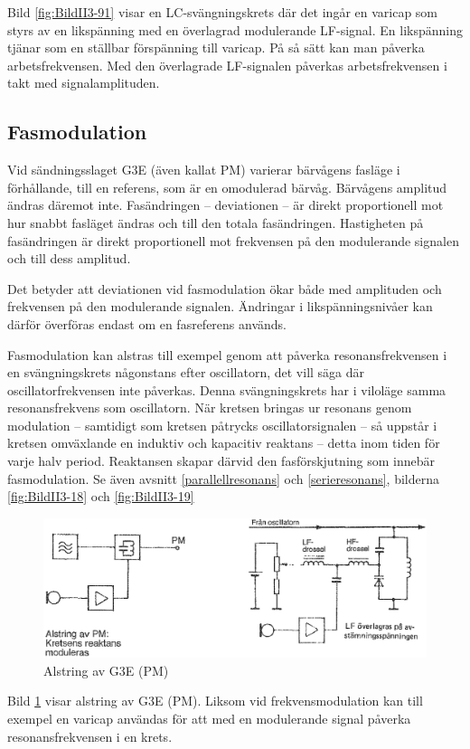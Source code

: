 Bild \ref{fig:BildII3-91} visar en LC-svängningskrets där det ingår en
varicap som styrs av en likspänning med en överlagrad modulerande LF-signal.
En likspänning tjänar som en ställbar förspänning till varicap.
På så sätt kan man påverka arbetsfrekvensen.
Med den överlagrade LF-signalen påverkas arbetsfrekvensen i takt med
signalamplituden.

\subsection{Fasmodulation}

Vid sändningsslaget G3E (även kallat PM) varierar bärvågens fasläge i
förhållande, till en referens, som är en omodulerad bärvåg.
Bärvågens amplitud ändras däremot inte.
Fasändringen -- deviationen -- är direkt proportionell mot hur snabbt fasläget
ändras och till den totala fasändringen.
Hastigheten på fasändringen är direkt proportionell mot frekvensen på den
modulerande signalen och till dess amplitud.

Det betyder att deviationen vid fasmodulation ökar både med amplituden
och frekvensen på den modulerande signalen.
Ändringar i likspänningsnivåer kan därför överföras endast om en fasreferens
används.

Fasmodulation kan alstras till exempel genom att påverka resonansfrekvensen i
en svängningskrets någonstans efter oscillatorn, det vill säga där
oscillatorfrekvensen inte påverkas.
Denna svängningskrets har i viloläge samma resonansfrekvens som oscillatorn.
När kretsen bringas ur resonans genom modulation -- samtidigt som kretsen
påtrycks oscillatorsignalen -- så uppstår i kretsen omväxlande en induktiv och
kapacitiv reaktans -- detta inom tiden för varje halv period.
Reaktansen skapar därvid den fasförskjutning som innebär fasmodulation.
Se även avsnitt \ref{parallellresonans} och \ref{serieresonans}, bilderna
\ref{fig:BildII3-18} och \ref{fig:BildII3-19}

\begin{figure}
\includegraphics[width=\textwidth]{images/cropped_pdfs/bild_2_3-92.pdf}
\caption{Alstring av G3E (PM)}
\label{fig:BildII3-92}
\end{figure}

Bild \ref{fig:BildII3-92} visar alstring av G3E (PM).
Liksom vid frekvensmodulation kan till exempel en varicap användas för att
med en modulerande signal påverka resonansfrekvensen i en krets.
